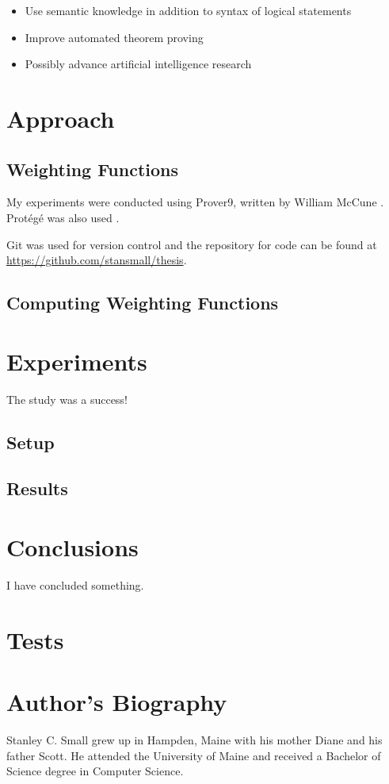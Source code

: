 \documentclass{article}
\begin{document}
\begin{spacing}{2}
	
		\begin{itemize}
		    \item Use semantic knowledge in addition to syntax of logical statements
		    \item Improve automated theorem proving
		    \item Possibly advance artificial intelligence research
		\end{itemize}

\newpage	
\section{Approach}
\subsection{Weighting Functions}
My experiments were conducted using Prover9, written by William McCune \cite{mccune2005prover9}. Prot{\'e}g{\'e} was also used \cite{gennari2003evolution}.

Git was used for version control and the repository for code can be found at \url{https://github.com/stansmall/thesis}.

\subsection{Computing Weighting Functions}

\newpage
\section{Experiments}
The study was a success!
\subsection{Setup}
\subsection{Results}
\newpage
\section{Conclusions}
I have concluded something. 
\nocite{*}
\newpage
\printbibliography
\newpage
\appendix
\section{Tests}
\newpage
\section*{Author's Biography}
Stanley C. Small grew up in Hampden, Maine with his mother Diane and his father Scott. He attended the University of Maine and received a Bachelor of Science degree in Computer Science. 

\end{spacing}
\end{document}
